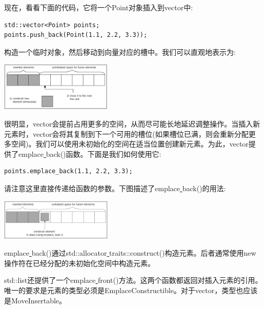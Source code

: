 现在，看看下面的代码，它将一个Point对象插入到vector中: \par

\begin{lstlisting}[caption={}]
std::vector<Point> points;
points.push_back(Point(1.1, 2.2, 3.3));
\end{lstlisting}

构造一个临时对象，然后移动到向量对应的槽中。我们可以直观地表示为: \par

\begin{center}
	\includegraphics[width=0.4\textwidth]{content/Section-2/Chapter-6/15}
\end{center}

很明显，vector会提前占用更多的空间，从而尽可能长地延迟调整操作。当插入新元素时，vector会将其复制到下一个可用的槽位(如果槽位已满，则会重新分配更多空间)。我们可以使用未初始化的空间在适当位置创建新元素。为此，vector提供了emplace\underline{ }back()函数。下面是我们如何使用它: \par

\begin{lstlisting}[caption={}]
points.emplace_back(1.1, 2.2, 3.3);
\end{lstlisting}

请注意这里直接传递给函数的参数。下图描述了emplace\underline{ }back()的用法: \par

\begin{center}
	\includegraphics[width=0.4\textwidth]{content/Section-2/Chapter-6/16}
\end{center}

emplace\underline{ }back()通过std::allocator\underline{ }traits::construct()构造元素。后者通常使用new操作符在已经分配的未初始化空间中构造元素。 \par
std::list还提供了一个emplace\underline{ }front()方法。这两个函数都返回对插入元素的引用。唯一的要求是元素的类型必须是EmplaceConstructible。对于vector，类型也应该是MoveInsertable。 \par

